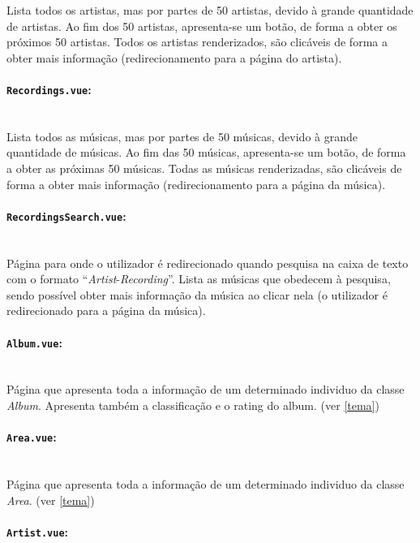 \documentclass{article}
\begin{document}
Lista todos os artistas, mas por partes de 50 artistas, devido à grande quantidade de artistas. Ao fim dos 50 artistas, apresenta-se um botão, de forma a obter os próximos 50 artistas. Todos os artistas renderizados, são clicáveis de forma a obter mais informação (redirecionamento para a página do artista).

\paragraph{\texttt{Recordings.vue}:}\mbox{}\\

Lista todos as músicas, mas por partes de 50 músicas, devido à grande quantidade de músicas. Ao fim das 50 músicas, apresenta-se um botão, de forma a obter as próximas 50 músicas. Todas as músicas renderizadas, são clicáveis de forma a obter mais informação (redirecionamento para a página da música).

\paragraph{\texttt{RecordingsSearch.vue}:}\mbox{}\\

Página para onde o utilizador é redirecionado quando pesquisa na caixa de texto com o formato ``\textit{Artist}-\textit{Recording}''. Lista as músicas que obedecem à pesquisa, sendo possível obter mais informação da música ao clicar nela (o utilizador é redirecionado para a página da música).

\paragraph{\texttt{Album.vue}:}\mbox{}\\

Página que apresenta toda a informação de um determinado individuo da classe \textit{Album}. Apresenta também a classificação e o rating do album. (ver \ref{tema})

\paragraph{\texttt{Area.vue}:}\mbox{}\\

Página que apresenta toda a informação de um determinado individuo da classe \textit{Area}. (ver \ref{tema})

\paragraph{\texttt{Artist.vue}:}\mbox{}\\
\end{document}
